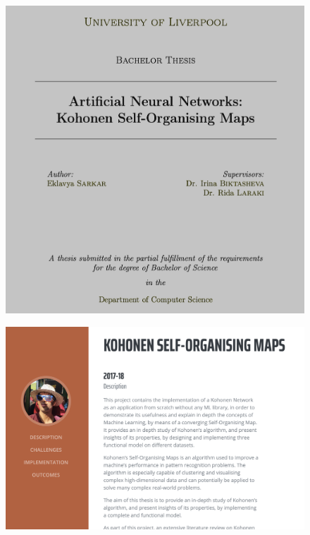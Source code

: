 \documentclass[fleqn, journal, onecolumn]{IEEEtran}             %
\theoremstyle{break}                                            %
\begin{document}
      \begin{figure}[h!]
        \centering
        \includegraphics[width=\textwidth]{Tesis1}
      \end{figure}

      \begin{figure}[h!]
        \centering
        \includegraphics[width=\textwidth]{Tesis2}
      \end{figure}
\end{document}
